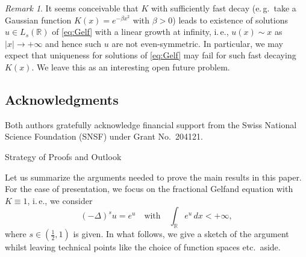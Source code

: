 \documentclass[reqno,10pt,a4paper]{amsart}
\makeatletter
\newtheorem{prop}{Proposition}[section]
\theoremstyle{definition}
\theoremstyle{definition}
\theoremstyle{remark}
\theoremstyle{remark}
\newtheorem*{remark*}{Remark}
\numberwithin{equation}{section}
\newcommand{\R}{\mathbb{R}}
\newcommand{\be}{\begin{equation}}
\newcommand{\ee}{\end{equation}}
\newcommand{\Ds}{(-\Delta)^{s}}
\def\section{\@startsection{section}{1}%
  \z@{1.5\linespacing\@plus\linespacing}{.5\linespacing}%
  {\normalfont\bfseries\large\centering}}
\makeatother
\begin{document}
 \begin{remark*}
 It seems conceivable that $K$ with sufficiently fast decay (e.\,g.~take a Gaussian function $K(x) = e^{-\beta x^2}$ with $\beta > 0$) leads to existence of solutions $u \in L_s(\R)$ of \eqref{eq:Gelf} with a linear growth at infinity, i.\,e., $u(x) \sim x$ as $|x| \to +\infty$ and hence such $u$ are not even-symmetric. In particular, we may expect that uniqueness  for solutions of \eqref{eq:Gelf} may fail for such fast decaying $K(x)$. We leave this as an interesting open future problem.
 \end{remark*}
%
%

\subsection*{Acknowledgments}
Both authors gratefully acknowledge financial support from the Swiss National Science Foundation (SNSF) under Grant No.~204121. 

\section{Strategy of Proofs and Outlook}
\label{sec:strategy}

Let us summarize the arguments needed to prove the main results in this paper. For the ease of presentation, we focus on the fractional Gelfand equation with $K \equiv 1$, i.\,e., we consider   
\be \label{eq:Gelf_intro}
\Ds u = e^u \quad \mbox{with} \quad \int_{\R} e^u \, dx < +\infty,
\ee 
where $s \in (\frac 1 2, 1)$ is given. In what follows, we give a sketch of the argument whilst leaving technical points like the choice of function spaces etc.~aside. 
\end{document}
